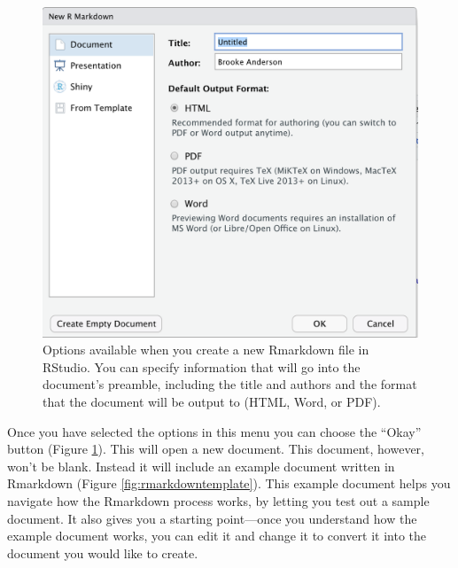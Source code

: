 \documentclass[]{tufte-book}
\begin{document}
\begin{figure}
\includegraphics[width=\textwidth]{figures/rmarkdown_choices} \caption[Options available when you create a new Rmarkdown file in RStudio]{Options available when you create a new Rmarkdown file in RStudio. You can specify information that will go into the document's preamble, including the title and authors and the format that the document will be output to (HTML, Word, or PDF).}\label{fig:rmarkdownchoices}
\end{figure}

Once you have selected the options in this menu you can choose the ``Okay'' button
(Figure \ref{fig:rmarkdownchoices}). This will open a new document. This
document, however, won't be blank. Instead it will include an example document
written in Rmarkdown (Figure \ref{fig:rmarkdowntemplate}). This example
document helps you navigate how the Rmarkdown process works, by letting you test
out a sample document. It also gives you a starting point---once you understand
how the example document works, you can edit it and change it to convert it
into the document you would like to create.
\end{document}
